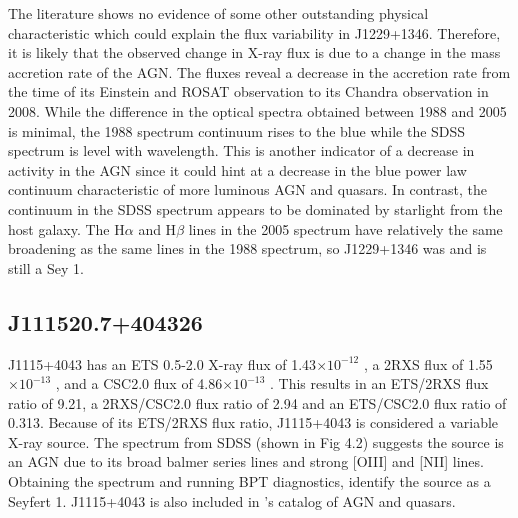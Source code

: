 The literature shows no evidence of some other outstanding physical characteristic which could explain the flux variability in J1229+1346. 
Therefore, it is likely that the observed change in X-ray flux is due to a change in the mass accretion rate of the AGN. 
The fluxes reveal a decrease in the accretion rate from the time of its Einstein and ROSAT observation to its Chandra observation in 2008. 
While the difference in the optical spectra obtained between 1988 and 2005 is minimal, the 1988 spectrum continuum rises to the blue while the SDSS spectrum is level with wavelength. 
This is another indicator of a decrease in activity in the AGN since it could hint at a decrease in the blue power law continuum characteristic of more luminous AGN and quasars. 
In contrast, the continuum in the SDSS spectrum appears to be dominated by starlight from the host galaxy.
The H$\alpha$ and H$\beta$ lines in the 2005 spectrum have relatively the same broadening as the same lines in the 1988 spectrum, so J1229+1346 was and is still a Sey 1.

\FloatBarrier




\subsection{J111520.7+404326}

J1115+4043 has an ETS 0.5-2.0 X-ray flux of 1.43$\times 10^{-12}$ \fluxunits, a 2RXS flux of 1.55$\times 10^{-13}$ \fluxunits, and a CSC2.0 flux of 4.86$\times 10^{-13}$ \fluxunits. 
This results in an ETS/2RXS flux ratio of 9.21, a 2RXS/CSC2.0 flux ratio of 2.94 and an ETS/CSC2.0 flux ratio of 0.313. 
Because of its ETS/2RXS flux ratio, J1115+4043 is considered a variable X-ray source. 
The spectrum from SDSS (shown in Fig 4.2) suggests the source is an AGN due to its broad balmer series lines and strong [OIII] and [NII] lines. 
Obtaining the spectrum and running BPT diagnostics, \cite{akiyama2003} identify the source as a Seyfert 1. 
J1115+4043 is also included in \cite{veron2006}’s catalog of AGN and quasars.


